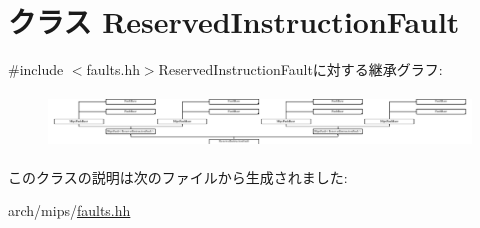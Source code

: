\hypertarget{classMipsISA_1_1ReservedInstructionFault}{
\section{クラス ReservedInstructionFault}
\label{classMipsISA_1_1ReservedInstructionFault}
}


{\ttfamily \#include $<$faults.hh$>$}ReservedInstructionFaultに対する継承グラフ:\begin{figure}[H]
\begin{center}
\leavevmode
\includegraphics[height=1.46444cm]{classMipsISA_1_1ReservedInstructionFault}
\end{center}
\end{figure}


このクラスの説明は次のファイルから生成されました:\begin{DoxyCompactItemize}
\item 
arch/mips/\hyperlink{arch_2mips_2faults_8hh}{faults.hh}\end{DoxyCompactItemize}
